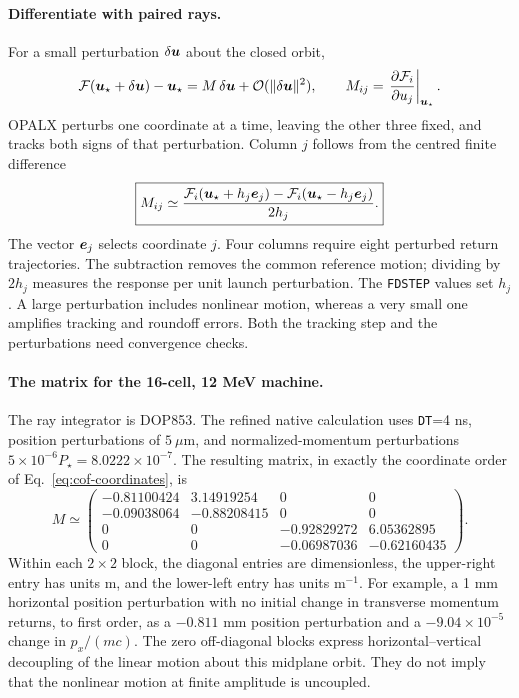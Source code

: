 \paragraph{Differentiate with paired rays.}
For a small perturbation $\delta\boldsymbol{u}$ about the closed orbit,
\begin{equation}
 \mathcal F(\boldsymbol{u}_\star+\delta\boldsymbol{u})-\boldsymbol{u}_\star
       =M\,\delta\boldsymbol{u}+\mathcal O(\|\delta\boldsymbol{u}\|^2),\qquad
 M_{ij}=\left.\frac{\partial\mathcal F_i}{\partial u_j}
                                                   \right|_{\boldsymbol{u}_\star}.
 \label{eq:cof-linearization}
\end{equation}
OPALX perturbs one coordinate at a time, leaving the other three fixed, and
tracks both signs of that perturbation. Column $j$ follows from the centred
finite difference
\begin{equation}
 \boxed{M_{ij}\simeq
 \frac{\mathcal F_i(\boldsymbol{u}_\star+h_j\boldsymbol{e}_j)
             -\mathcal F_i(\boldsymbol{u}_\star-h_j\boldsymbol{e}_j)}{2h_j}.}
 \label{eq:cof-finite-difference}
\end{equation}
The vector $\boldsymbol{e}_j$ selects coordinate $j$. Four columns require eight
perturbed return trajectories. The subtraction removes the common reference
motion; dividing by $2h_j$ measures the response per unit launch perturbation.
The \texttt{FDSTEP} values set $h_j$. A large perturbation includes nonlinear
motion, whereas a very small one amplifies tracking and roundoff errors.
Both the tracking step and the perturbations need convergence checks.

\paragraph{The matrix for the 16-cell, 12 MeV machine.}
The ray integrator is DOP853. The refined native calculation uses
\texttt{DT}=4 ns, position perturbations of $5\ \mu$m, and normalized-momentum
perturbations $5\times10^{-6}P_\star=8.0222\times10^{-7}$.
The resulting matrix, in exactly the coordinate order of
Eq.~\eqref{eq:cof-coordinates}, is
\begin{equation}
 \boxed{M\simeq\begin{pmatrix}
 -0.81100424 & 3.14919254 & 0 & 0\\
 -0.09038064 &-0.88208415 & 0 & 0\\
 0 & 0 &-0.92829272 & 6.05362895\\
 0 & 0 &-0.06987036 &-0.62160435
 \end{pmatrix}.}
 \label{eq:cof-machine-matrix}
\end{equation}
Within each $2\times2$ block, the diagonal entries are dimensionless, the
upper-right entry has units m, and the lower-left entry has units m$^{-1}$.
For example, a 1 mm horizontal position perturbation with no initial change
in transverse momentum returns, to first order, as a $-0.811$ mm position
perturbation and a $-9.04\times10^{-5}$ change in $p_x/(mc)$.
The zero off-diagonal blocks express horizontal--vertical decoupling of the
linear motion about this midplane orbit. They do not imply that the nonlinear
motion at finite amplitude is uncoupled.

